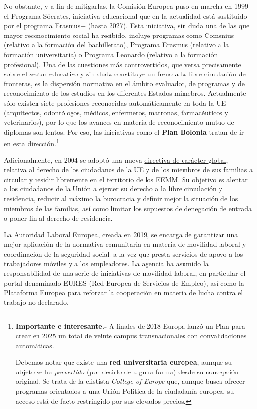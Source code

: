 \documentclass[10pt,a4paper]{article}
\begin{document}
No obstante, y a fin de mitigarlas, la Comisión Europea puso en marcha en 1999 el Programa Sócrates, iniciativa educacional que en la actualidad está sustituido por el programa Erasmus+ (hasta 2027). Esta iniciativa, sin duda una de las que mayor reconocimiento social ha recibido, incluye programas como Comenius (relativo a la formación del bachillerato), Programa Erasmus (relativo a la formación universitaria) o Programa Leonardo (relativo a la formación profesional). Una de las cuestiones más controvertidos, que versa precisamente sobre el sector educativo y sin duda constituye un freno a la libre circulación de fronteras, es la dispersión normativa en el ámbito evaluador, de programas y de reconocimiento de los estudios en los diferentes Estados mimebros. Actualmente sólo existen siete profesiones reconocidas automáticamente en toda la UE (arquitectos, odontólogos, médicos, enfermeros, matronas, farmacéuticos y veterinarios), por lo que los avances en materia de reconocimiento mutuo de diplomas son lentos. Por eso, las iniciativas como el \textbf{Plan Bolonia} tratan de ir en esta dirección.\footnote{%
    \textbf{Importante e interesante.-} A finales de 2018 Europa lanzó un Plan para crear en 2025 un total de veinte campus transnacionales con convalidaciones automáticas.

Debemos notar que existe una \textbf{red universitaria europea}, aunque su objeto se ha \textit{pervertido} (por decirlo de alguna forma) desde su concepción original. Se trata de la elistista \textit{College of Europe} que, aunque busca ofrecer programas orientados a una Unión Política de la ciudadanía europea, su acceso está de facto restringido por sus elevados precios.
}

Adicionalmente, en 2004 se adoptó una nueva \href{https://www.boe.es/doue/2004/229/L00035-00048.pdf}{directiva de carácter global, relativa al derecho de los ciudadanos de la UE y de los miembros de sus familias a circular y residir libremente en el territorio de los EEMM}. Su objetivo es alentar a los ciudadanos de la Unión a ejercer su derecho a la libre circulación y residencia, reducir al máximo la burocracia y definir mejor la situación de los miembros de las familias, así como limitar los supuestos de denegación de entrada o poner fin al derecho de residencia.

La \href{https://www.ela.europa.eu/es}{Autoridad Laboral Europea}, creada en 2019, se encarga de garantizar una mejor aplicación de la normativa comunitaria en materia de movilidad laboral y coordinación de la seguridad social, a la vez que presta servicios de apoyo a los trabajadores móviles y a los empleadores. La agencia ha asumido la responsabilidad de una serie de iniciativas de movilidad laboral, en particular el portal denominado EURES (Red Europea de Servicios de Empleo), así como la Plataforma Europea para reforzar la cooperación en materia de lucha contra el trabajo no declarado.
\end{document}
